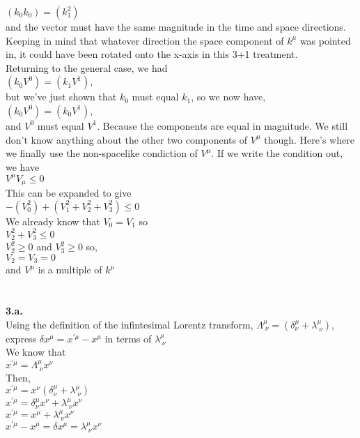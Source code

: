 \documentclass[prb,preprint]
{revtex4-1}
\newcommand{\PRLsep}{\noindent\makebox[\linewidth]{\resizebox{0.8888\linewidth}{2pt}{$\bullet$}}\bigskip}
\begin{document}
$\left(k_0 k_0\right) = \left(k_1^2\right)$
\\
and the vector must have the same magnitude in the time and space directions.  Keeping in mind that whatever direction the space component of $k^\mu$ was pointed in, it could have been rotated onto the x-axis in this 3+1 treatment.
\\
Returning to the general case, we had 
\\
$\left(k_0 V^0\right) = \left(k_1 V^1\right)$, 
\\
but we've just shown that $k_0$ must equal $k_1$, so we now have, 
\\
$\left(k_0 V^0\right) = \left(k_0 V^1\right)$, 
\\
and $V^0$ must equal $V^1$.  Because the components are equal in magnitude.  We still don't know anything about the other two components of $V^\mu$ though.  Here's where we finally use the non-spacelike condiction of $V^\mu$.  If we write the condition out, we have 
\\
$V^\mu V_\mu \leq 0$
\\
This can be expanded to give 
\\
$-\left(V_0^2\right) + \left(V_1^2 + V_2^2 + V_3^2\right) \leq 0$
\\
We already know that $V_0 = V_1$ so
\\
$V_2^2 + V_3^2 \leq 0$
\\
$V_2^2 \geq 0$ and $V_3^2 \geq 0$ so,
\\
$V_2 = V_3 = 0$
\\
and $V^\mu$ is a multiple of $k^\mu$
\\
\\
\PRLsep
\\
\textbf{3.a.}
\\
Using the definition of the infintesimal Lorentz transform, $\Lambda^\mu_{\;\nu} = \left(\delta^\mu_\nu + \lambda^\mu_{\;\nu}\right)$, 
express $\delta x^\mu = x^{\prime\mu} - x^\mu$ in terms of $\lambda^\mu_{\;\nu}$
\\
We know that 
\\
$x^{\prime\mu} = \Lambda^\mu_{\;\nu} x^\nu$
\\
Then,
\\
$x^{\prime\mu} = x^\nu\left(\delta^\mu_\nu + \lambda^\mu_{\;\nu}\right) $
\\
$x^{\prime\mu} = \delta^\mu_\nu x^\nu + \lambda^\mu_{\;\nu}x^\nu $
\\
$x^{\prime\mu} = x^\mu + \lambda^\mu_{\;\nu}x^\nu $
\\
$x^{\prime\mu} - x^\mu = \delta x^\mu = \lambda^\mu_{\;\nu}x^\nu $
\end{document}
